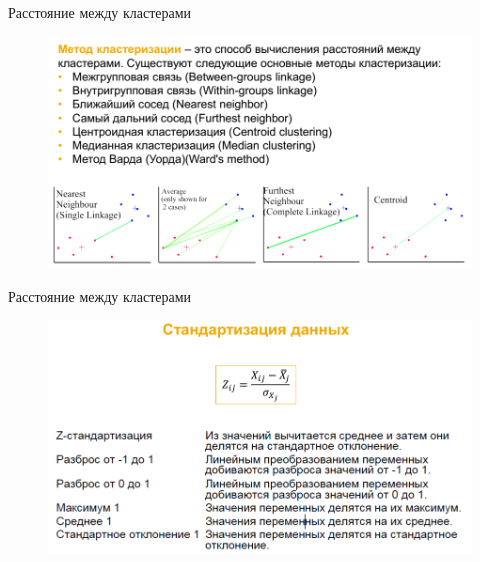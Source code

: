 \documentclass{beamer}
\begin{document}
\begin{frame}{Расстояние между кластерами}
\begin{figure}[h]
\centering
\includegraphics[scale=0.4]{images/lec07-pic17.png}
\end{figure}
\end{frame}

\begin{frame}{Расстояние между кластерами}
\begin{figure}[h]
\centering
\includegraphics[scale=0.4]{images/lec07-pic24.png}
\end{figure}
\end{frame}
\end{document}
